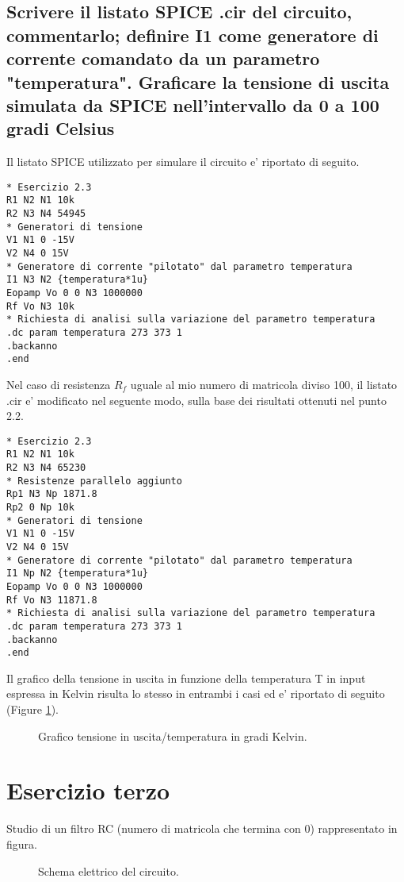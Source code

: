 \documentclass[a4paper,10pt]{article}
\begin{document}
\subsection{Scrivere il listato SPICE .cir del circuito, commentarlo; definire I1 come generatore di corrente comandato da un parametro "temperatura". Graficare la tensione di uscita simulata da SPICE nell'intervallo da 0 a 100 gradi Celsius}
Il listato SPICE utilizzato per simulare il circuito e' riportato di seguito.
\small
\begin{verbatim}
* Esercizio 2.3
R1 N2 N1 10k
R2 N3 N4 54945
* Generatori di tensione
V1 N1 0 -15V
V2 N4 0 15V
* Generatore di corrente "pilotato" dal parametro temperatura
I1 N3 N2 {temperatura*1u}
Eopamp Vo 0 0 N3 1000000
Rf Vo N3 10k
* Richiesta di analisi sulla variazione del parametro temperatura
.dc param temperatura 273 373 1
.backanno
.end
\end{verbatim}
\normalsize
Nel caso di resistenza $R_f$ uguale al mio numero di matricola diviso 100, il listato .cir e' modificato nel seguente modo, sulla base dei risultati ottenuti nel punto 2.2.
\small
\begin{verbatim}
* Esercizio 2.3
R1 N2 N1 10k
R2 N3 N4 65230
* Resistenze parallelo aggiunto
Rp1 N3 Np 1871.8
Rp2 0 Np 10k
* Generatori di tensione
V1 N1 0 -15V
V2 N4 0 15V
* Generatore di corrente "pilotato" dal parametro temperatura
I1 Np N2 {temperatura*1u}
Eopamp Vo 0 0 N3 1000000
Rf Vo N3 11871.8
* Richiesta di analisi sulla variazione del parametro temperatura
.dc param temperatura 273 373 1
.backanno
.end
\end{verbatim} 
\normalsize
Il grafico della tensione in uscita in funzione della temperatura T in input espressa in Kelvin risulta lo stesso in entrambi i casi ed e' riportato di seguito (Figure \ref{fig:tensionetemper}). 
\begin{figure}[h!]
	\centering
  	\caption{Grafico tensione in uscita/temperatura in gradi Kelvin.}
  	\label{fig:tensionetemper}
\end{figure}


\pagebreak
\section{Esercizio terzo}
Studio di un filtro RC (numero di matricola che termina con 0) rappresentato in figura.
\begin{figure}[h!]
	\centering
  	\caption{Schema elettrico del circuito.}
  	\label{fig:ckt3}
\end{figure}
\end{document}
